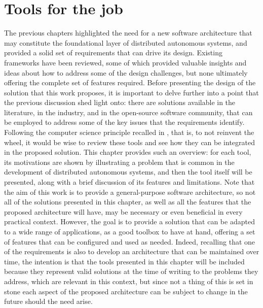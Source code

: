 \chapter{Tools for the job}
\label{ch:tools}
\doublespacing
\vspace{-2.5cm}

The previous chapters highlighted the need for a new software architecture that may constitute the foundational layer of distributed autonomous systems, and provided a solid set of requirements that can drive its design. Existing frameworks have been reviewed, some of which provided valuable insights and ideas about how to address some of the design challenges, but none ultimately offering the complete set of features required. Before presenting the design of the solution that this work proposes, it is important to delve further into a point that the previous discussion shed light onto: there are solutions available in the literature, in the industry, and in the open-source software community, that can be employed to address some of the key issues that the requirements identify. Following the computer science principle recalled in , that is, to not reinvent the wheel, it would be wise to review these tools and see how they can be integrated in the proposed solution. This chapter provides such an overview: for each tool, its motivations are shown by illustrating a problem that is common in the development of distributed autonomous systems, and then the tool itself will be presented, along with a brief discussion of its features and limitations. Note that the aim of this work is to provide a general-purpose software architecture, so not all of the solutions presented in this chapter, as well as all the features that the proposed architecture will have, may be necessary or even beneficial in every practical context. However, the goal is to provide a solution that can be adapted to a wide range of applications, as a good toolbox to have at hand, offering a set of features that can be configured and used as needed. Indeed, recalling that one of the requirements is also to develop an architecture that can be maintained over time, the intention is that the tools presented in this chapter will be included because they represent valid solutions at the time of writing to the problems they address, which are relevant in this context, but since not a thing of this is set in stone each aspect of the proposed architecture can be subject to change in the future should the need arise.

